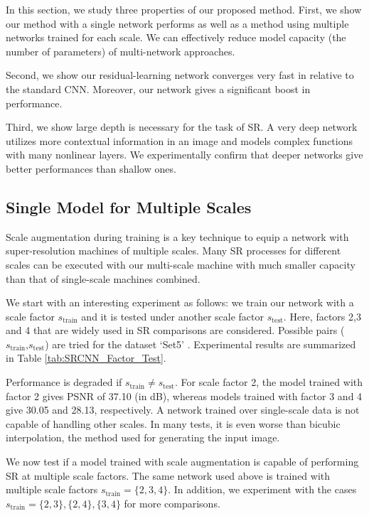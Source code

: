 \documentclass[10pt,twocolumn,letterpaper]{article}
\begin{document}
In this section, we study three properties of our proposed method. First, we show our method with a single network performs as well as a method using multiple networks trained for each scale. We can effectively reduce model capacity (the number of parameters) of multi-network approaches.

Second, we show our residual-learning network converges very fast in relative to the standard CNN. Moreover, our network gives a significant boost in performance. 

Third, we show large depth is necessary for the task of SR. A very deep network utilizes more contextual information in an image and models complex functions with many nonlinear layers. We experimentally confirm that deeper networks give better performances than shallow ones. 

\subsection{Single Model for Multiple Scales}
Scale augmentation during training is a key technique to equip a network with super-resolution machines of multiple scales. Many SR processes for different scales can be executed with our multi-scale machine with much smaller capacity than that of single-scale machines combined. 

We start with an interesting experiment as follows: we train our network with a scale factor $s_{\text{train}}$ and it is tested under another scale factor $s_{\text{test}}$. Here, factors 2,3 and 4 that are widely used in SR comparisons are considered. Possible pairs ($s_{\text{train}}$,$s_{\text{test}}$) are tried for the dataset `Set5' \cite{bevilacqua2012}. Experimental results are summarized in Table \ref{tab:SRCNN_Factor_Test}. 

Performance is degraded if $s_{\text{train}} \neq s_{\text{test}}$. For scale factor 2, the model trained with factor 2 gives PSNR of 37.10 (in dB), whereas models trained with factor 3 and 4 give 30.05 and 28.13, respectively. A network trained over single-scale data is not capable of handling other scales. In many tests, it is even worse than bicubic interpolation, the method used for generating the input image. 

We now test if a model trained with scale augmentation is capable of performing SR at multiple scale factors. The same network used above is trained with multiple scale factors $s_{\text{train}} = \{2,3,4\}$. In addition, we experiment with the cases $s_{\text{train}} = \{2,3\}, \{2,4\}, \{3,4\}$ for more comparisons. 
\end{document}
